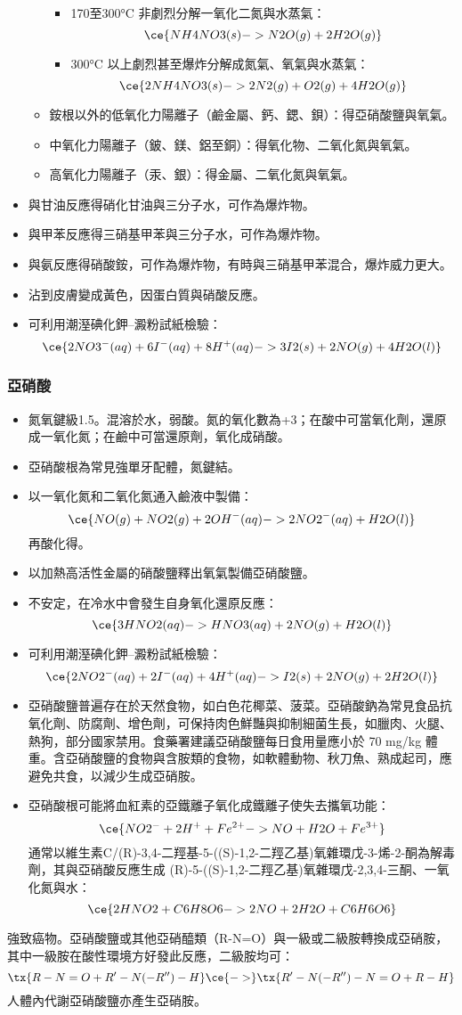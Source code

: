\documentclass[a4paper,12pt]{report}
\begin{document}
\begin{itemize}
\begin{itemize}
\begin{itemize}
\item 170至300°C 非劇烈分解一氧化二氮與水蒸氣：
\[\ce{NH4NO3(s) -> N2O(g) + 2H2O(g)}\]
\item 300°C 以上劇烈甚至爆炸分解成氮氣、氧氣與水蒸氣：
\[\ce{2NH4NO3(s) -> 2N2(g) + O2(g) + 4H2O(g)}\]
\end{itemize}
\item 銨根以外的低氧化力陽離子（鹼金屬、鈣、鍶、鋇）：得亞硝酸鹽與氧氣。
\item 中氧化力陽離子（鈹、鎂、鋁至銅）：得氧化物、二氧化氮與氧氣。
\item 高氧化力陽離子（汞、銀）：得金屬、二氧化氮與氧氣。
\end{itemize}
\item 與甘油反應得硝化甘油與三分子水，可作為爆炸物。
\item 與甲苯反應得三硝基甲苯與三分子水，可作為爆炸物。
\item 與氨反應得硝酸銨，可作為爆炸物，有時與三硝基甲苯混合，爆炸威力更大。
\item 沾到皮膚變成黃色，因蛋白質與硝酸反應。
\item 可利用潮溼碘化鉀–澱粉試紙檢驗：
\[\ce{2NO3^-(aq) + 6I^-(aq) + 8H^+(aq) -> 3I2(s) + 2NO(g) + 4H2O(l)}\]
\end{itemize}
\subsubsection{亞硝酸}
\begin{itemize}
\item 氮氧鍵級1.5。混溶於水，弱酸。氮的氧化數為+3；在酸中可當氧化劑，還原成一氧化氮；在鹼中可當還原劑，氧化成硝酸。
\item 亞硝酸根為常見強單牙配體，氮鍵結。
\item 以一氧化氮和二氧化氮通入鹼液中製備：
\[\ce{NO(g) + NO2(g) + 2OH^-(aq) -> 2NO2^-(aq) + H2O(l)}\]
再酸化得。
\item 以加熱高活性金屬的硝酸鹽釋出氧氣製備亞硝酸鹽。
\item 不安定，在冷水中會發生自身氧化還原反應：
\[\ce{3HNO2(aq) -> HNO3(aq) + 2NO(g) + H2O(l)}\]
\item 可利用潮溼碘化鉀–澱粉試紙檢驗：
\[\ce{2NO2^-(aq) + 2I^-(aq) + 4H^+(aq) -> I2(s) + 2NO(g) + 2H2O(l)}\]
\item 亞硝酸鹽普遍存在於天然食物，如白色花椰菜、菠菜。亞硝酸鈉為常見食品抗氧化劑、防腐劑、增色劑，可保持肉色鮮豔與抑制細菌生長，如臘肉、火腿、熱狗，部分國家禁用。食藥署建議亞硝酸鹽每日食用量應小於 70 mg/kg 體重。含亞硝酸鹽的食物與含胺類的食物，如軟體動物、秋刀魚、熟成起司，應避免共食，以減少生成亞硝胺。
\item 亞硝酸根可能將血紅素的亞鐵離子氧化成鐵離子使失去攜氧功能：
\[\ce{NO2^- + 2H^+ + Fe^{2+} -> NO + H2O + Fe^{3+}}\]
通常以維生素C/(R)-3,4-二羥基-5-((S)-1,2-二羥乙基)氧雜環戊-3-烯-2-酮為解毒劑，其與亞硝酸反應生成 (R)-5-((S)-1,2-二羥乙基)氧雜環戊-2,3,4-三酮、一氧化氮與水：
\[\ce{2HNO2 + C6H8O6 -> 2NO + 2H2O + C6H6O6}\]
\end{itemize}
強致癌物。亞硝酸鹽或其他亞硝醯類（R-N=O）與一級或二級胺轉換成亞硝胺，其中一級胺在酸性環境方好發此反應，二級胺均可：
\[\tx{R-N=O + R'-N(-R'')-H}\ce{->}\tx{R'-N(-R'')-N=O + R-H}\]
人體內代謝亞硝酸鹽亦產生亞硝胺。
\end{document}
